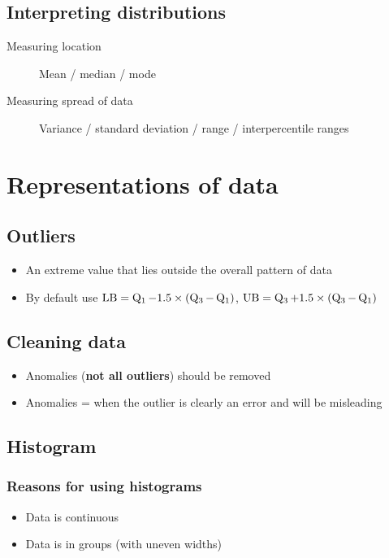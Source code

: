 \section{Interpreting distributions}
\begin{description}
	\item[Measuring location] Mean / median / mode
	\item[Measuring spread of data] Variance / standard deviation / range / interpercentile ranges
\end{description}





\chapter{Representations of data}
\section{Outliers}
\begin{itemize}
	\item An extreme value that lies outside the overall pattern of data
	\item By default use $\text{LB} = \operatorname{Q_1} - 1.5\times(\operatorname{Q_3}-\operatorname{Q_1})$, $\text{UB} = \operatorname{Q_3} + 1.5\times(\operatorname{Q_3}-\operatorname{Q_1})$
\end{itemize}

\section{Cleaning data}
\begin{itemize}
	\item Anomalies (\textbf{not all outliers}) should be removed
	\item Anomalies = when the outlier is clearly an error and will be misleading
\end{itemize}


\section{Histogram}
\subsection{Reasons for using histograms}
\begin{itemize}
	\item Data is continuous
	\item Data is in groups (with uneven widths)
\end{itemize}
